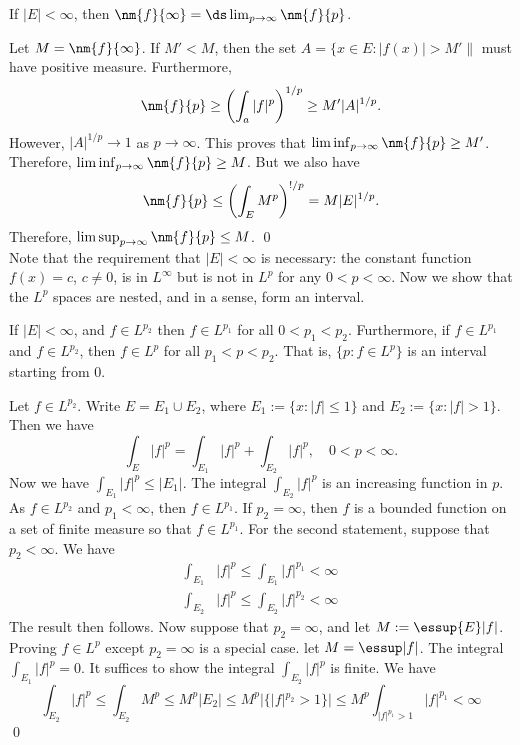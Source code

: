 \begin{prop}
If $|E|<\infty$, then $\nm{f}{\infty}= \ds\lim_{p \to \infty} \nm{f}{p}$. 
\end{prop}

\pf Let $M= \nm{f}{\infty}$. If $M' < M$, then the set $A= \{ x \in E \colon |f(x)|>M'\|$ must have positive measure. Furthermore,
	\[
	\nm{f}{p} \geq \left( \int_a |f|^p \right)^{1/p} \geq M' |A|^{1/p}.
	\]
However, $|A|^{1/p} \to 1$ as $p \to \infty$. This proves that $\liminf_{p \to \infty} \nm{f}{p} \geq M'$. Therefore, $\liminf_{p \to \infty} \nm{f}{p} \geq M$. But we also have
	\[
	\nm{f}{p} \leq \left( \int_E M^p \right)^{!/p}= M |E|^{1/p}.
	\]
Therefore, $\limsup_{p \to \infty} \nm{f}{p} \leq M$. \qed \\


Note that the requirement that $|E|<\infty$ is necessary: the constant function $f(x)=c$, $c \neq 0$, is in $L^\infty$ but is not in $L^p$ for any $0<p<\infty$. Now we show that the $L^p$ spaces are nested, and in a sense, form an interval. 


\begin{prop} \hfill
If $|E|<\infty$, and $f \in L^{p_2}$ then $f \in L^{p_1}$ for all $0<p_1<p_2$. Furthermore, if $f \in L^{p_1}$ and $f \in L^{p_2}$, then $f \in L^p$ for all $p_1<p<p_2$. That is, $\{p \colon f \in L^p\}$ is an interval starting from 0.
\end{prop}

\pf Let $f \in L^{p_2}$. Write $E= E_1 \cup E_2$, where $E_1:=\{ x \colon |f| \leq 1\}$ and $E_2:= \{ x \colon |f|>1\}$. Then we have
	\[
	\int_E |f|^p = \int_{E_1} |f|^p + \int_{E_2} |f|^p, \quad 0<p<\infty. 
	\]
Now we have $\int_{E_1} |f|^p \leq |E_1|$. The integral $\int_{E_2} |f|^p$ is an increasing function in $p$. As $f \in L^{p_2}$ and $p_1<\infty$, then $f \in L^{p_1}$. If $p_2= \infty$, then $f$ is a bounded function on a set of finite measure so that $f \in L^{p_1}$. For the second statement, suppose that $p_2<\infty$. We have
	\[
	\begin{split}
	\int_{E_1}& |f|^p \leq \int_{E_1} |f|^{p_1} < \infty \\
	\int_{E_2}& |f|^p \leq \int_{E_2} |f|^{p_2} < \infty
	\end{split}
	\]
The result then follows. Now suppose that $p_2= \infty$, and let $M:= \essup{E} |f|$. Proving $f \in L^p$ except $p_2=\infty$ is a special case. let $M= \essup |f|$. The integral $\int_{E_1} |f|^p=0$. It suffices to show the integral $\int_{E_2} |f|^p$ is finite. We have
	\[
	\int_{E_2} |f|^p \leq \int_{E_2} M^p \leq M^p |E_2| \leq M^p |\{ |f|^{p_2}>1\}| \leq M^p \int_{|f|^{p_1}>1} |f|^{p_1} < \infty 
	\] \qed \\


